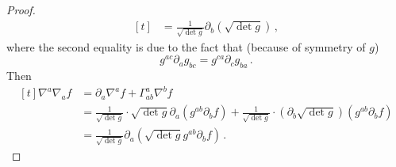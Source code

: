 \documentclass[titlepage,numbers=noenddot,oneside,%
cleardoublepage=empty,paper=a4,fontsize=11pt,%
english,%
]{scrartcl}
\newcommand*{\mathcomma}{\,,}
\newcommand*{\mathfullstop}{\,.}
\begin{document}
\begin{proof}
\begin{equation*}
\begin{aligned}[t]
            &=\frac{1}{\sqrt{\det{g}}}\partial_b(\sqrt{\det{g}})\mathcomma
        \end{aligned}
    \end{equation*}
    where the second equality is due to the fact that (because of symmetry of \( g \))
    \begin{equation*}
        g^{ac}\partial_{a}g_{bc}=g^{ca}\partial_c g_{ba}\mathfullstop
    \end{equation*}
    Then    
    \begin{equation*}
        \begin{aligned}[t]
            \nabla^a \nabla_a f&= \partial_a \nabla^a f+\Gamma^a_{ab} \nabla^b f\\
            &=\frac{1}{\sqrt{\det{g}}}\cdot \sqrt{\det{g}}\partial_a(g^{ab} \partial_b f)+\frac{1}{\sqrt{\det{g}}}\cdot (\partial_b \sqrt{\det{g}})(g^{ab}\partial_b f)\\
            &=\frac{1}{\sqrt{\det{g}}}\partial_a(\sqrt{\det{g}}g^{ab}\partial_b f)\mathfullstop
        \end{aligned}
    \end{equation*}
\end{proof}
\end{document}
